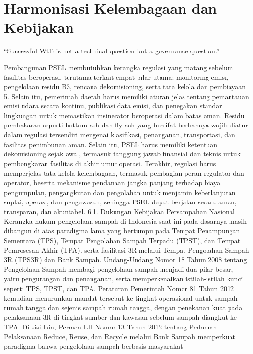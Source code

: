 \documentclass[
  letterpaper,
  DIV=11,
  numbers=noendperiod]{scrreprt}
\begin{document}

\chapter{Harmonisasi Kelembagaan dan
Kebijakan}\label{harmonisasi-kelembagaan-dan-kebijakan}

``Successful WtE is not a technical question but a governance
question.''

Pembangunan PSEL membutuhkan kerangka regulasi yang matang sebelum
fasilitas beroperasi, terutama terkait empat pilar utama: monitoring
emisi, pengelolaan residu B3, rencana dekomisioning, serta tata kelola
dan pembiayaan 5. Selain itu, pemerintah daerah harus memiliki aturan
jelas tentang pemantauan emisi udara secara kontinu, publikasi data
emisi, dan penegakan standar lingkungan untuk memastikan insinerator
beroperasi dalam batas aman. Residu pembakaran seperti bottom ash dan
fly ash yang bersifat berbahaya wajib diatur dalam regulasi tersendiri
mengenai klasifikasi, penanganan, transportasi, dan fasilitas penimbunan
aman. Selain itu, PSEL harus memiliki ketentuan dekomisioning sejak
awal, termasuk tanggung jawab finansial dan teknis untuk pembongkaran
fasilitas di akhir umur operasi. Terakhir, regulasi harus memperjelas
tata kelola kelembagaan, termasuk pembagian peran regulator dan
operator, beserta mekanisme pendanaan jangka panjang terhadap biaya
pengumpulan, pengangkutan dan pengolahan untuk menjamin keberlanjutan
suplai, operasi, dan pengawasan, sehingga PSEL dapat berjalan secara
aman, transparan, dan akuntabel. 6.1. Dukungan Kebijakan Persampahan
Nasional Kerangka hukum pengelolaan sampah di Indonesia saat ini pada
dasarnya masih dibangun di atas paradigma lama yang bertumpu pada Tempat
Penampungan Sementara (TPS), Tempat Pengolahan Sampah Terpadu (TPST),
dan Tempat Pemrosesan Akhir (TPA), serta fasilitasi 3R melalui Tempat
Pengolahan Sampah 3R (TPS3R) dan Bank Sampah. Undang-Undang Nomor 18
Tahun 2008 tentang Pengelolaan Sampah membagi pengelolaan sampah menjadi
dua pilar besar, yaitu pengurangan dan penanganan, serta memperkenalkan
istilah-istilah kunci seperti TPS, TPST, dan TPA. Peraturan Pemerintah
Nomor 81 Tahun 2012 kemudian menurunkan mandat tersebut ke tingkat
operasional untuk sampah rumah tangga dan sejenis sampah rumah tangga,
dengan penekanan kuat pada pelaksanaan 3R di tingkat sumber dan kawasan
sebelum sampah diangkut ke TPA. Di sisi lain, Permen LH Nomor 13 Tahun
2012 tentang Pedoman Pelaksanaan Reduce, Reuse, dan Recycle melalui Bank
Sampah memperkuat paradigma bahwa pengelolaan sampah berbasis masyarakat
\end{document}
